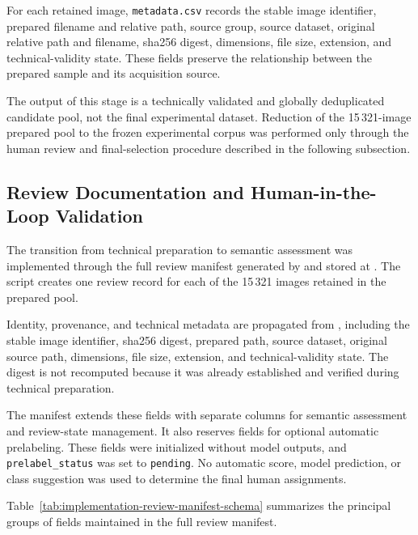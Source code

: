 For each retained image, \texttt{metadata.csv} records the stable image
identifier, prepared filename and relative path, source group, source dataset,
original relative path and filename, \gls{sha256} digest, dimensions, file
size, extension, and technical-validity state. These fields preserve the
relationship between the prepared sample and its acquisition source.

The output of this stage is a technically validated and globally deduplicated
candidate pool, not the final experimental dataset. Reduction of the
15\,321-image prepared pool to the frozen experimental corpus was performed
only through the human review and final-selection procedure described in the
following subsection.

\subsection{Review Documentation and Human-in-the-Loop Validation}
\label{subsec:implementation-human-review}

The transition from technical preparation to semantic assessment was
implemented through the full review manifest generated by
 and
stored at
. The script
creates one review record for each of the 15\,321 images retained in the
prepared pool.

Identity, provenance, and technical metadata are propagated from
, including the stable image
identifier, \gls{sha256} digest, prepared path, source dataset, original source
path, dimensions, file size, extension, and technical-validity state. The
digest is not recomputed because it was already established and verified during
technical preparation.

The manifest extends these fields with separate columns for semantic assessment
and review-state management. It also reserves fields for optional automatic
prelabeling. These fields were initialized without model outputs, and
\texttt{prelabel\_status} was set to \texttt{pending}. No automatic score,
model prediction, or class suggestion was used to determine the final human
assignments.

Table~\ref{tab:implementation-review-manifest-schema} summarizes the principal
groups of fields maintained in the full review manifest.

